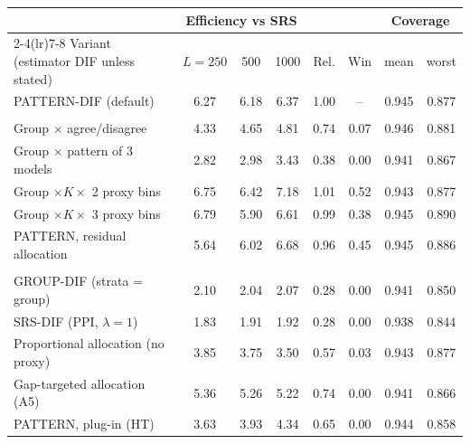 \begin{tabular}{lccccccc}
\toprule
 & \multicolumn{3}{c}{Efficiency vs SRS} & & & \multicolumn{2}{c}{Coverage} \\
\cmidrule(lr){2-4}\cmidrule(lr){7-8}
Variant (estimator DIF unless stated) & $L=250$ & 500 & 1000 & Rel. & Win & mean & worst \\
\midrule
PATTERN-DIF (default) & 6.27 & 6.18 & 6.37 & 1.00 & -- & 0.945 & 0.877 \\
\addlinespace
\multicolumn{8}{l}{\emph{A1: stratifier}}\\
Group $\times$ agree/disagree & 4.33 & 4.65 & 4.81 & 0.74 & 0.07 & 0.946 & 0.881 \\
Group $\times$ pattern of 3 models & 2.82 & 2.98 & 3.43 & 0.38 & 0.00 & 0.941 & 0.867 \\
Group $\times K\times$ 2 proxy bins & 6.75 & 6.42 & 7.18 & 1.01 & 0.52 & 0.943 & 0.877 \\
Group $\times K\times$ 3 proxy bins & 6.79 & 5.90 & 6.61 & 0.99 & 0.38 & 0.945 & 0.890 \\
PATTERN, residual allocation & 5.64 & 6.02 & 6.68 & 0.96 & 0.45 & 0.945 & 0.886 \\
\addlinespace
\multicolumn{8}{l}{\emph{References}}\\
GROUP-DIF (strata = group) & 2.10 & 2.04 & 2.07 & 0.28 & 0.00 & 0.941 & 0.850 \\
SRS-DIF (PPI, $\lambda=1$) & 1.83 & 1.91 & 1.92 & 0.28 & 0.00 & 0.938 & 0.844 \\
Proportional allocation (no proxy) & 3.85 & 3.75 & 3.50 & 0.57 & 0.03 & 0.943 & 0.877 \\
Gap-targeted allocation (A5) & 5.36 & 5.26 & 5.22 & 0.74 & 0.00 & 0.941 & 0.866 \\
PATTERN, plug-in (HT) & 3.63 & 3.93 & 4.34 & 0.65 & 0.00 & 0.944 & 0.858 \\
\bottomrule
\end{tabular}
